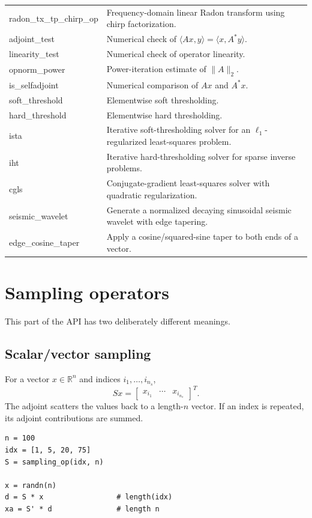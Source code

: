 \documentclass[11pt]{article}
\begin{document}
\begin{longtable}{>{\ttfamily}p{}p{}}
radon\_tx\_tp\_chirp\_op & Frequency-domain linear Radon transform using chirp factorization. \\
adjoint\_test & Numerical check of $\langle Ax,y\rangle=\langle x,A^*y\rangle$. \\
linearity\_test & Numerical check of operator linearity. \\
opnorm\_power & Power-iteration estimate of $\|A\|_2$. \\
is\_selfadjoint & Numerical comparison of $Ax$ and $A^*x$. \\
soft\_threshold & Elementwise soft thresholding. \\
hard\_threshold & Elementwise hard thresholding. \\
ista & Iterative soft-thresholding solver for an $\ell_1$-regularized least-squares problem. \\
iht & Iterative hard-thresholding solver for sparse inverse problems. \\
cgls & Conjugate-gradient least-squares solver with quadratic regularization. \\
seismic\_wavelet & Generate a normalized decaying sinusoidal seismic wavelet with edge tapering. \\
edge\_cosine\_taper & Apply a cosine/squared-sine taper to both ends of a vector. \\
\bottomrule
\end{longtable}

\section{Sampling operators}
This part of the API has two deliberately different meanings.

\subsection{Scalar/vector sampling}
For a vector $x\in\mathbb{R}^{n}$ and indices $i_1,\ldots,i_{n_s}$,
\[
   Sx = \begin{bmatrix}x_{i_1}&\cdots&x_{i_{n_s}}\end{bmatrix}^{T}.
\]
The adjoint scatters the values back to a length-$n$ vector.  If an index is
repeated, its adjoint contributions are summed.

\begin{verbatim}
n = 100
idx = [1, 5, 20, 75]
S = sampling_op(idx, n)

x = randn(n)
d = S * x                 # length(idx)
xa = S' * d               # length n
\end{verbatim}
\end{document}
